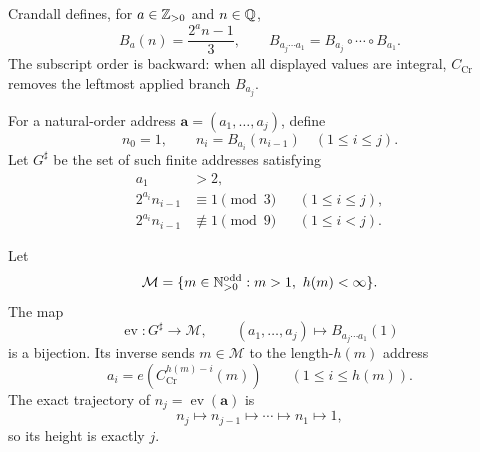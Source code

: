 Crandall defines, for $a\in\mathbb{Z}_{>0}$ and $n\in\mathbb{Q}$,
\begin{equation}
\label{eq:Crandall-backward-branch}
 B_a(n)=\frac{2^a n-1}{3},
 \qquad
 B_{a_j\cdots a_1}=B_{a_j}\circ\cdots\circ B_{a_1}.
\end{equation}
The subscript order is backward: when all displayed values are integral,
$C_{\mathrm{Cr}}$ removes the leftmost applied branch $B_{a_j}$.

For a natural-order address $\mathbf a=(a_1,\ldots,a_j)$, define
\begin{equation}
\label{eq:Crandall-address-recursion}
 n_0=1,
 \qquad
 n_i=B_{a_i}(n_{i-1})\quad(1\leq i\leq j).
\end{equation}
Let $G^\sharp$ be the set of such finite addresses satisfying
\begin{align}
 a_1&>2,
 \label{eq:Crandall-address-first-gate}\\
 2^{a_i}n_{i-1}&\equiv1\pmod3
 &&(1\leq i\leq j),
 \label{eq:Crandall-address-integrality-gate}\\
 2^{a_i}n_{i-1}&\not\equiv1\pmod9
 &&(1\leq i<j).
 \label{eq:Crandall-address-continuation-gate}
\end{align}

\begin{theorem}
\label{thm:Crandall-address-bijection}
Let
\[
 \mathcal M=\{m\in\Opos:m>1,\ h(m)<\infty\}.
\]
The map
\begin{equation}
\label{eq:Crandall-address-evaluation}
 \operatorname{ev}:G^\sharp\longrightarrow\mathcal M,
 \qquad
 (a_1,\ldots,a_j)\longmapsto B_{a_j\cdots a_1}(1)
\end{equation}
is a bijection.  Its inverse sends $m\in\mathcal M$ to the length-$h(m)$
address
\begin{equation}
\label{eq:Crandall-address-inverse}
 a_i=e(C_{\mathrm{Cr}}^{h(m)-i}(m))
 \qquad(1\leq i\leq h(m)).
\end{equation}
The exact trajectory of $n_j=\operatorname{ev}(\mathbf a)$ is
\[
 n_j\longmapsto n_{j-1}\longmapsto\cdots\longmapsto n_1
 \longmapsto1,
\]
so its height is exactly $j$.
\end{theorem}

